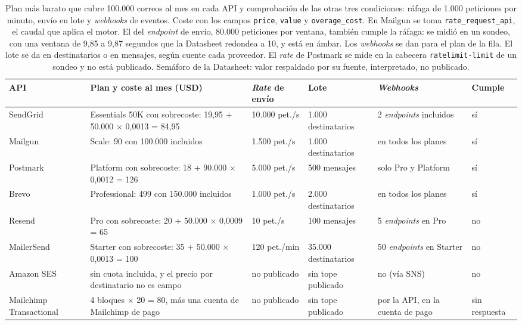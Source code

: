 \begin{table}[tbp]
\centering
\small
\begin{tabular}{|p{2.0cm}|p{3.2cm}|p{2.2cm}|p{1.9cm}|p{2.0cm}|p{1.5cm}|}
\hline
\textbf{API} & \textbf{Plan y coste al mes (USD)} & \textbf{\textit{Rate} de envío} & \textbf{Lote} & \textbf{\textit{Webhooks}} & \textbf{Cumple} \\
\hline
SendGrid & Essentials 50K con sobrecoste: 19,95 + 50.000 $\times$ 0,0013 = 84,95 & 10.000 pet./s \semverde{} & 1.000 destinatarios & 2 \textit{endpoints} incluidos & sí \\
\hline
Mailgun & Scale: 90 con 100.000 incluidos & 1.500 pet./s \semambar{} & 1.000 destinatarios & en todos los planes & sí \\
\hline
Postmark & Platform con sobrecoste: 18 + 90.000 $\times$ 0,0012 = 126 & 5.000 pet./s \semambar{} & 500 mensajes & solo Pro y Platform & sí \\
\hline
Brevo & Professional: 499 con 150.000 incluidos & 1.000 pet./s \semambar{} & 2.000 destinatarios \semambar{} & en todos los planes & sí \\
\hline
Resend & Pro con sobrecoste: 20 + 50.000 $\times$ 0,0009 = 65 & 10 pet./s \semverde{} & 100 mensajes & 5 \textit{endpoints} en Pro & no \\
\hline
MailerSend & Starter con sobrecoste: 35 + 50.000 $\times$ 0,0013 = 100 & 120 pet./min \semverde{} & 35.000 destinatarios & 50 \textit{endpoints} en Starter & no \\
\hline
Amazon SES & sin cuota incluida, y el precio por destinatario no es campo & no publicado \semrojo{} & sin tope publicado & no (vía SNS) & no \\
\hline
Mailchimp Transactional & 4 bloques $\times$ 20 \semambar{} = 80, más una cuenta de Mailchimp de pago & no publicado \semrojo{} & sin tope publicado & por la API, en la cuenta de pago & sin respuesta \\
\hline
\end{tabular}
\caption[Respuesta del catálogo al caso de los 100.000 correos]{Plan más barato que cubre 100.000 correos al mes en cada API y comprobación de las otras tres condiciones: ráfaga de 1.000 peticiones por minuto, envío en lote y \textit{webhooks} de eventos. Coste con los campos \texttt{price}, \texttt{value} y \texttt{overage\_cost}. En Mailgun se toma \texttt{rate\_request\_api}, el caudal que aplica el motor. El del \textit{endpoint} de envío, 80.000 peticiones por ventana, también cumple la ráfaga: se midió en un sondeo, con una ventana de 9,85 a 9,87 segundos que la Datasheet redondea a 10, y está en ámbar. Los \textit{webhooks} se dan para el plan de la fila. El lote se da en destinatarios o en mensajes, según cuente cada proveedor. El \textit{rate} de Postmark se mide en la cabecera \texttt{ratelimit-limit} de un sondeo y no está publicado. Semáforo de la Datasheet: \semverde{} valor respaldado por su fuente, \semambar{} interpretado, \semrojo{} no publicado.}
\label{tab:comparacion:caso}
\end{table}

